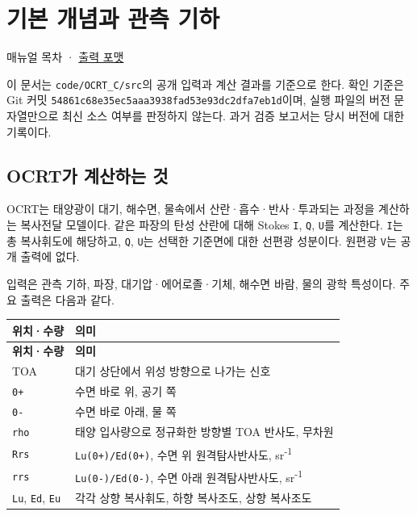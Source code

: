 \chapter{기본 개념과 관측 기하}
\label{chap:01_concepts_geometry}
매뉴얼 목차 · \hyperref[chap:05_output_formats]{출력 포맷}

이 문서는 \texttt{code/\allowbreak{}OCRT\_\allowbreak{}C/\allowbreak{}src}의 공개 입력과 계산 결과를 기준으로 한다. 확인 기준은 Git 커밋 \texttt{54861c68e35ec5aa\allowbreak{}a3938fad53e93dc2\allowbreak{}dfa7eb1d}이며, 실행 파일의 버전 문자열만으로 최신 소스 여부를 판정하지 않는다. 과거 검증 보고서는 당시 버전에 대한 기록이다.

\section{OCRT가 계산하는 것}
\label{sec:auto:01_concepts_geometry:1}
OCRT는 태양광이 대기, 해수면, 물속에서 산란·흡수·반사·투과되는 과정을 계산하는 복사전달 모델이다. 같은 파장의 탄성 산란에 대해 Stokes \texttt{I}, \texttt{Q}, \texttt{U}를 계산한다. \texttt{I}는 총 복사휘도에 해당하고, \texttt{Q}, \texttt{U}는 선택한 기준면에 대한 선편광 성분이다. 원편광 \texttt{V}는 공개 출력에 없다.

입력은 관측 기하, 파장, 대기압·에어로졸·기체, 해수면 바람, 물의 광학 특성이다. 주요 출력은 다음과 같다.


{\TableFont
\begin{longtable}{@{}>{\raggedright\arraybackslash}p{}>{\raggedright\arraybackslash}p{}@{}}
\toprule
\textbf{위치·수량} & \textbf{의미} \\
\midrule
\endfirsthead
\toprule
\textbf{위치·수량} & \textbf{의미} \\
\midrule
\endhead
\bottomrule
\endfoot
TOA & 대기 상단에서 위성 방향으로 나가는 신호 \\
\texttt{0+} & 수면 바로 위, 공기 쪽 \\
\texttt{0-\allowbreak{}} & 수면 바로 아래, 물 쪽 \\
\texttt{rho} & 태양 입사량으로 정규화한 방향별 TOA 반사도, 무차원 \\
\texttt{Rrs} & \texttt{Lu(0+)/\allowbreak{}Ed(0+)}, 수면 위 원격탐사반사도, sr\textsuperscript{-}\textsuperscript{1} \\
\texttt{rrs} & \texttt{Lu(0-\allowbreak{})/\allowbreak{}Ed(0-\allowbreak{})}, 수면 아래 원격탐사반사도, sr\textsuperscript{-}\textsuperscript{1} \\
\texttt{Lu}, \texttt{Ed}, \texttt{Eu} & 각각 상향 복사휘도, 하향 복사조도, 상향 복사조도 \\
\end{longtable}
}

